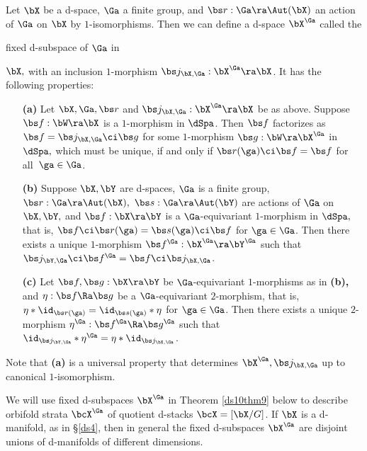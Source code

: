 \documentclass{article}
\begin{document}
\begin{thm} Let\/ $\bX$ be a d-space, $\Ga$ a finite group, and\/
$\bs r:\Ga\ra\Aut(\bX)$ an action of\/ $\Ga$ on\/ $\bX$ by
$1$-isomorphisms. Then we can define a d-space\/ $\bX^\Ga$ called
the \begin{bfseries}fixed d-subspace of\/ $\Ga$ in\/\end{bfseries}
$\bX,$ with an inclusion $1$-morphism\/ $\bs j_{\bX,\Ga}:\bX^\Ga
\ra\bX$. It has the following properties:
\begin{itemize}
\setlength{\itemsep}{0pt}
\setlength{\parsep}{0pt}
\item[{\bf(a)}] Let\/ $\bX,\Ga,\bs r$ and\/ $\bs
j_{\bX,\Ga}:\bX^\Ga\ra\bX$ be as above. Suppose $\bs
f:\bW\ra\bX$ is a $1$-morphism in $\dSpa$. Then $\bs f$
factorizes as $\bs f=\bs j_{\bX,\Ga}\ci\bs g$ for some
$1$-morphism $\bs g:\bW\ra\bX^\Ga$ in $\dSpa,$ which must be
unique, if and only if\/ $\bs r(\ga)\ci\bs f=\bs f$ for
all\/~$\ga\in\Ga$.

\item[{\bf(b)}] Suppose $\bX,\bY$ are d-spaces, $\Ga$ is a finite
group, $\bs r:\Ga\ra\Aut(\bX),$ $\bs s:\Ga\ra\Aut(\bY)$ are
actions of\/ $\Ga$ on $\bX,\bY,$ and\/ $\bs f:\bX\ra\bY$ is a
$\Ga$-equivariant\/ $1$-morphism in $\dSpa,$ that is, $\bs
f\ci\bs r(\ga)=\bs s(\ga)\ci\bs f$ for\/ $\ga\in\Ga$. Then there
exists a unique\/ $1$-morphism $\bs f^\Ga:\bX^\Ga\ra\bY^\Ga$
such that\/~$\bs j_{\bY,\Ga}\ci\bs f^\Ga=\bs f\ci\bs
j_{\bX,\Ga}$.
\item[{\bf(c)}] Let\/ $\bs f,\bs g:\bX\ra\bY$ be
$\Ga$-equivariant\/ $1$-morphisms as in {\bf(b)\rm,} and\/
$\eta:\bs f\Ra\bs g$ be a $\Ga$-equivariant\/ $2$-morphism, that
is, $\eta*\id_{\bs r(\ga)}=\id_{\bs s(\ga)}*\eta$ for\/
$\ga\in\Ga$. Then there exists a unique $2$-morphism
$\eta^\Ga:\bs f^\Ga\Ra\bs g^\Ga$ such that\/~$\id_{\bs
j_{\bY,\Ga}}*\eta^\Ga=\eta*\id_{\bs j_{\bX,\Ga}}$.
\end{itemize}
Note that\/ {\bf(a)} is a universal property that determines
$\bX^\Ga,\bs j_{\bX,\Ga}$ up to canonical\/ $1$-isomorphism.
\label{ds3thm5}
\end{thm}

We will use fixed d-subspaces $\bX^\Ga$ in Theorem \ref{ds10thm9}
below to describe orbifold strata $\bcX^\Ga$ of quotient
d-stacks $\bcX=[\bX/G]$. If $\bX$ is a d-manifold, as in
\S\ref{ds4}, then in general the fixed d-subspaces $\bX^\Ga$ are
disjoint unions of d-manifolds of different
dimensions.
\end{document}
